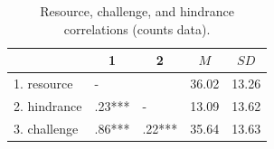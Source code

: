 \documentclass[
  jou]{apa6}
\begin{document}
\begin{table}[tbp]

\begin{center}
\begin{threeparttable}

\caption{\label{tab:cortab}Resource, challenge, and hindrance correlations (counts data).}

\begin{tabular}{lllll}
\toprule
 & \multicolumn{1}{c}{1} & \multicolumn{1}{c}{2} & \multicolumn{1}{c}{$M$} & \multicolumn{1}{c}{$SD$}\\
\midrule
1. resource & - &  & 36.02 & 13.26\\
2. hindrance & .23*** & - & 13.09 & 13.62\\
3. challenge & .86*** & .22*** & 35.64 & 13.63\\
\bottomrule
\end{tabular}

\end{threeparttable}
\end{center}

\end{table}
\end{document}
